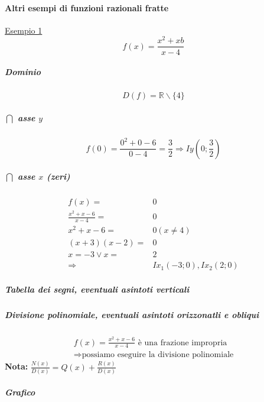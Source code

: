 \documentclass[../main.tex]{subfiles}
\begin{document}
\begin{center}
\end{center}

\vspace{0.5cm}
\paragraph{Altri esempi di funzioni razionali fratte} \underline{Esempio 1}
$$
    f(x) = \frac{x^2 + x b}{x-4}
$$

\subparagraph{Dominio}
$$
    D(f) = \mathbb{R}\backslash\{4\}
$$

\subparagraph{$\bigcap$ asse $y$}
$$
    f(0) = \frac{0^2 + 0 -6}{0-4} = \frac{3}{2} \Rightarrow Iy(0;\frac{3}{2}) 
$$

\subparagraph{$\bigcap$ asse $x$ (zeri)}
\begin{align*}
    f(x) =& 0 \\
    \frac{x^2 + x -6}{x - 4} =& 0 \\
    x^2+x-6=& 0 (x\neq4) \\
    (x+3)(x-2) =& 0 \\
    x=-3\vee x =& 2 \\
    \Rightarrow& Ix_1(-3;0), Ix_2(2;0)
\end{align*}

\subparagraph{Tabella dei segni, eventuali asintoti verticali}

\subparagraph{Divisione polinomiale, eventuali asintoti orizzonatli e obliqui}
\begin{align*}
    f(x) = \frac{x^2+x-6}{x-4} \text{ è una frazione impropria} \\
    \Rightarrow \text{possiamo eseguire la divisione polinomiale}
\end{align*}
\textbf{Nota:} $\frac{N(x)}{D(x)} = Q(x) + \frac{R(x)}{D(x)}$

\subparagraph{Grafico}
\end{document}
